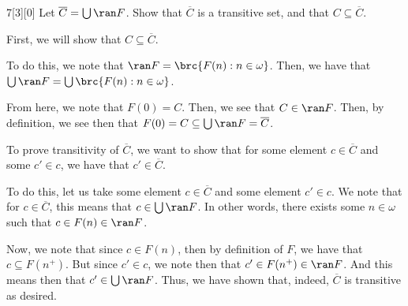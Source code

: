 \documentclass{article}
\begin{document}
\begin{hw}{7}[3][0]
	Let $\overline{C} = \bigcup \ran F$. Show that $\overline C$ is a transitive set, and that $C \subseteq \overline C$.
\end{hw}
\begin{solution}
	First, we will show that $C \subseteq \overline C$.
	\begin{innerproof}
		To do this, we note that $\ran F = \brc{F(n) : n \in \omega}$. Then, we have that $\bigcup \ran F = \bigcup \brc{F(n) : n \in \omega}$. 
		
		From here, we note that $F(0) = C$. Then, we see that $C \in \ran F$. Then, by definition, we see then that $F(0) = C \subseteq \bigcup \ran F = \overline C$.
	\end{innerproof}
	
	To prove transitivity of $\overline C$, we want to show that for some element $c \in \overline C$ and some $c' \in c$, we have that $c' \in \overline C$.
	\begin{innerproof}
		To do this, let us take some element $c \in \overline C$ and some element $c' \in c$. We note that for $c \in \overline C$, this means that $c \in \bigcup \ran F$. In other words, there exists some $n \in \omega$ such that $c \in F(n) \in \ran F$.
		
		Now, we note that since $c \in F(n)$, then by definition of $F$, we have that $c \subseteq F(n^{+})$. But since $c' \in c$, we note then that $c' \in F(n^{+}) \in \ran F$. And this means then that $c' \in \bigcup \ran F$. Thus, we have shown that, indeed, $\overline C$ is transitive as desired.
	\end{innerproof}
\end{solution}
\end{document}
